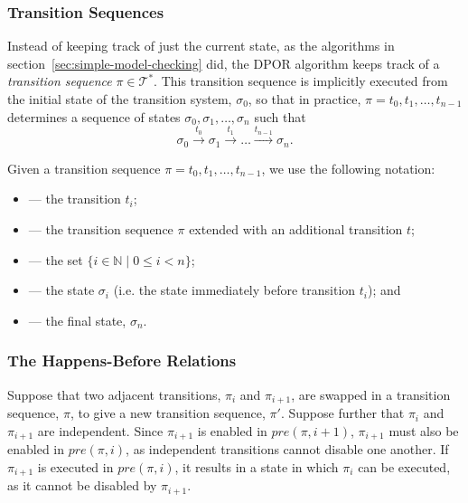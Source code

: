 \documentclass[12pt,a4paper,twoside,openright]{report}
\begin{document}
\subsubsection{Transition Sequences}
Instead of keeping track of just the current state, as
the algorithms in section~\ref{sec:simple-model-checking}
did, the DPOR algorithm keeps track of a \emph{transition
sequence} $\pi \in \mathcal{T}^*$. This transition
sequence is implicitly executed from the initial state of
the transition system, $\sigma_0$, so that in practice,
$\pi = t_0, t_1, \ldots, t_{n-1}$ determines a sequence of states
$\sigma_0, \sigma_1, \ldots, \sigma_n$ such that
\[
	\sigma_0 \xrightarrow{\ t_0\ } \sigma_1 \xrightarrow{\ t_1\ }
	\ldots \xrightarrow{t_{n-1}} \sigma_n.
\]

Given a transition sequence $\pi = t_0, t_1, \ldots, t_{n-1}$,
we use the following notation:
\begin{itemize}[label={}]
	\newcommand{\defsindent}{3.5em}
	\item{\makebox[\defsindent]{\hfill$\pi_i$}
		--- the transition $t_i$;}
	\item{\makebox[\defsindent]{\hfill$\pi.t$}
		--- the transition sequence $\pi$ extended with
		an additional transition $t$;}
	\item{\makebox[\defsindent]{\hfill$\textit{dom}(\pi)$}
		--- the set $\{i \in \mathbb{N} \mid 0 \leq i < n \}$;}
	\item{\makebox[\defsindent]{\hfill$\textit{pre}(\pi, i)$}
		--- the state $\sigma_i$ (i.e. the
		state immediately before transition $t_i$); and}
	\item{\makebox[\defsindent]{\hfill$\textit{last}(\pi)$}
		--- the final state, $\sigma_n$.}
\end{itemize}

\subsubsection{The Happens-Before Relations}\label{sec:happens-before}

Suppose that two adjacent transitions, $\pi_i$ and $\pi_{i+1}$,
are swapped in a
transition sequence, $\pi$, to give a new
transition sequence, $\pi'$. Suppose further
that $\pi_i$ and $\pi_{i+1}$ are independent.
Since $\pi_{i+1}$ is enabled in $\textit{pre}(\pi, i+1)$,
$\pi_{i+1}$ must also be enabled in $\textit{pre}(\pi, i)$,
as independent transitions cannot disable one another.
If $\pi_{i+1}$
is executed in $\textit{pre}(\pi, i)$,
it results in a state in which $\pi_i$
can be executed, as it cannot be disabled by $\pi_{i+1}$.
\end{document}
